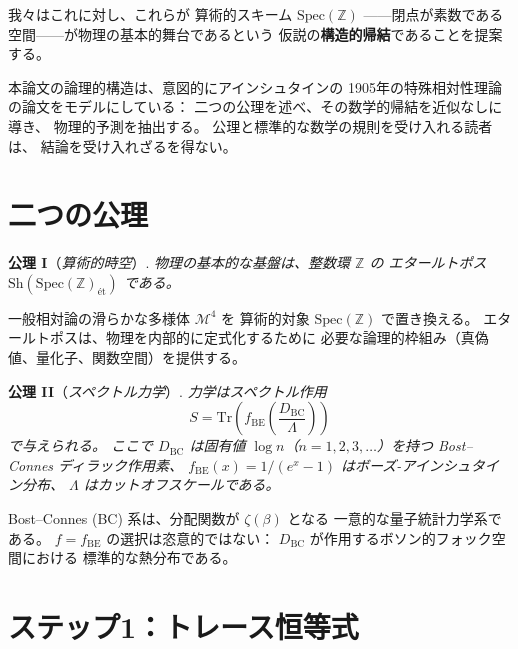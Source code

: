 \documentclass[11pt,a4paper]{article}
\newcommand{\Spec}{\mathrm{Spec}}
\newcommand{\Sh}{\mathrm{Sh}}
\newcommand{\Tr}{\mathrm{Tr}}
\begin{document}
我々はこれに対し、これらが
算術的スキーム $\Spec(\mathbb{Z})$
——閉点が素数である空間——が物理の基本的舞台であるという
仮説の\textbf{構造的帰結}であることを提案する。

本論文の論理的構造は、意図的にアインシュタインの
1905年の特殊相対性理論の論文をモデルにしている：
二つの公理を述べ、その数学的帰結を近似なしに導き、
物理的予測を抽出する。
公理と標準的な数学の規則を受け入れる読者は、
結論を受け入れざるを得ない。

\section{二つの公理}

\noindent\textbf{公理 I}（\textit{算術的時空}）.
\textit{物理の基本的な基盤は、整数環 $\mathbb{Z}$ の
エタールトポス $\Sh(\Spec(\mathbb{Z})_{\text{\'et}})$ である。}

\medskip

一般相対論の滑らかな多様体 $\mathcal{M}^4$ を
算術的対象 $\Spec(\mathbb{Z})$ で置き換える。
エタールトポスは、物理を内部的に定式化するために
必要な論理的枠組み（真偽値、量化子、関数空間）を提供する。

\medskip

\noindent\textbf{公理 II}（\textit{スペクトル力学}）.
\textit{力学はスペクトル作用
\begin{equation}
  \label{eq:master}
  S = \Tr\!\left(f_{\mathrm{BE}}\!\left(\frac{D_{\mathrm{BC}}}{\Lambda}\right)\right)
\end{equation}
で与えられる。
ここで $D_{\mathrm{BC}}$ は固有値 $\log n$（$n=1,2,3,\ldots$）を持つ
Bost--Connes ディラック作用素、
$f_{\mathrm{BE}}(x) = 1/(e^x-1)$ はボーズ-アインシュタイン分布、
$\Lambda$ はカットオフスケールである。}

\medskip

Bost--Connes (BC) 系は、分配関数が $\zeta(\beta)$ となる
一意的な量子統計力学系である。
$f=f_{\mathrm{BE}}$ の選択は恣意的ではない：
$D_{\mathrm{BC}}$ が作用するボソン的フォック空間における
標準的な熱分布である。

\section{ステップ1：トレース恒等式}
\end{document}
